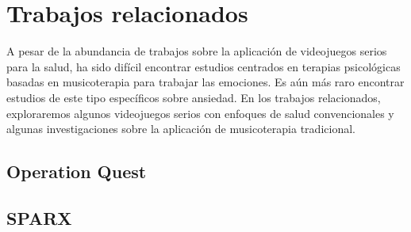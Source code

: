 \section{Trabajos relacionados}

A pesar de la abundancia de trabajos sobre la aplicación de videojuegos serios para la salud, ha sido difícil encontrar estudios centrados en terapias psicológicas basadas en musicoterapia para trabajar las emociones. Es aún más raro encontrar estudios de este tipo específicos sobre ansiedad. En los trabajos relacionados, exploraremos algunos videojuegos serios con enfoques de salud convencionales y algunas investigaciones sobre la aplicación de musicoterapia tradicional.

\subsection{Operation Quest}
\subsection{SPARX}

